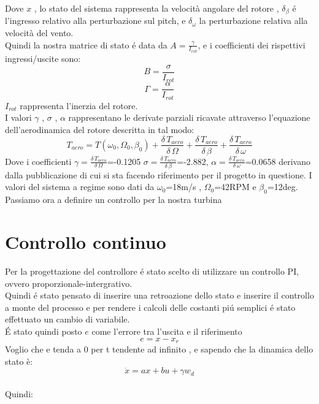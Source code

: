\documentclass[a4paper,13pt]{article}
\begin{document}
Dove $x$ , lo stato del sistema rappresenta la velocità angolare del rotore ,
$\delta_\beta$ \'e l'ingresso relativo alla perturbazione sul pitch, e
$\delta_\omega$ la perturbazione relativa alla velocità del vento.\\
Quindi la nostra matrice di stato \'e data da $A=\frac{\gamma}{I_{rot}}$,
e i coefficienti dei rispettivi ingressi/uscite sono:
\begin{equation}
B=\frac{\sigma}{I_{rot}}
\end{equation}
\begin{equation}
\Gamma=\frac{\alpha}{I_{rot}}
\end{equation}
$I_{rot}$ rappresenta l'inerzia del rotore.\\
I valori $\gamma$ , $\sigma$ , $\alpha$ rappresentano le derivate parziali ricavate attraverso 
l'equazione dell'aerodinamica del rotore descritta in tal modo:
\begin{equation}
T_{aero}=T(\omega_0,\Omega_0,\beta_0)+\frac{\delta \, T_{aero}}{\delta \, \Omega}+
\frac{\delta \, T_{aero}}{\delta \, \beta}+\frac{\delta \, T_{aero}}{\delta \, \omega}
\end{equation} 
Dove i coefficienti $\gamma=\frac{\delta \, T_{aero}}{\delta \, \Omega}$=-0.1205
$\sigma=\frac{\delta \, T_{aero}}{\delta \, \beta}$=-2.882,
$\alpha=\frac{\delta \, T_{aero}}{\delta \, \omega}$=0.0658
derivano dalla pubblicazione di cui si sta facendo riferimento per il progetto in questione.
I valori del sistema a regime sono dati da $\omega_0$=18m/s , $\Omega_0$=42RPM e $\beta_0$=12deg.
Passiamo ora a definire un controllo per la nostra turbina
\section{Controllo continuo}
Per la progettazione del controllore \'e stato scelto di utilizzare un controllo PI,\\
ovvero proporzionale-intergrativo.\\
Quindi \'e stato pensato di inserire una retroazione dello stato e inserire il controllo a monte del processo e per rendere i calcoli delle costanti pi\'u semplici \'e stato effettuato un cambio di variabile.\\
\'E stato quindi posto $e$ come l'errore tra l'uscita e il riferimento
\begin{equation*}
	e=x-x_{r}          %
\end{equation*}
Voglio che e tenda a 0 per t tendente ad infinito , e sapendo che la dinamica dello stato è:
\begin{equation*}
	\dot{x}=ax+bu+\gamma w_{d}    %
\end{equation*} \\
Quindi:
\end{document}
